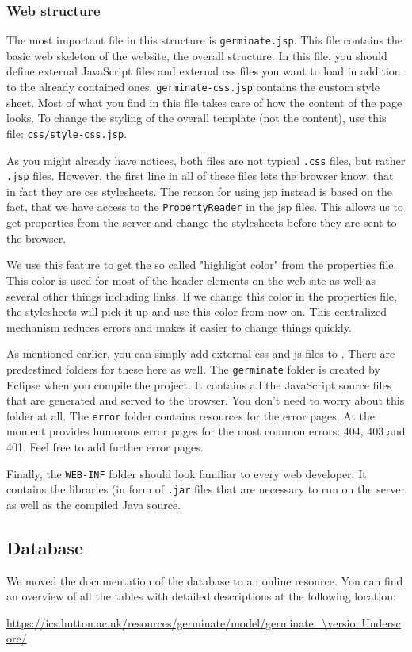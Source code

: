 \subsubsection{Web structure}
The most important file in this structure is \texttt{germinate.jsp}. This file contains the basic web skeleton of the website, \ie the overall structure. In this file, you should define external JavaScript files and external css files you want to load in addition to the already contained ones. \texttt{germinate-css.jsp} contains the custom {\germinate} style sheet. Most of what you find in this file takes care of how the content of the page looks. To change the styling of the overall template (not the content), use this file: \texttt{css/style-css.jsp}.

As you might already have notices, both files are not typical \texttt{.css} files, but rather \texttt{.jsp} files. However, the first line in all of these files lets the browser know, that in fact they are css stylesheets. The reason for using jsp instead is based on the fact, that we have access to the \texttt{PropertyReader} in the jsp files. This allows us to get properties from the server and change the stylesheets before they are sent to the browser.

We use this feature to get the so called "highlight color" from the properties file. This color is used for most of the header elements on the web site as well as several other things including links. If we change this color in the properties file, the stylesheets will pick it up and use this color from now on. This centralized mechanism reduces errors and makes it easier to change things quickly.

As mentioned earlier, you can simply add external css and js files to {\germinate}. There are predestined folders for these here as well. The \texttt{germinate} folder is created by Eclipse when you compile the project. It contains all the JavaScript source files that are generated and served to the browser. You don't need to worry about this folder at all. The \texttt{error} folder contains resources for the error pages. At the moment {\germinate} provides humorous error pages for the most common errors: 404, 403 and 401. Feel free to add further error pages.

Finally, the \texttt{WEB-INF} folder should look familiar to every web developer. It contains the libraries (in form of \texttt{.jar} files that are necessary to run {\germinate} on the server as well as the compiled Java source. 

\subsection{Database}
\label{sec:structure-database}

We moved the documentation of the database to an online resource. You can find an overview of all the tables with detailed descriptions at the following location:
\begin{center}
	\url{https://ics.hutton.ac.uk/resources/germinate/model/germinate_\versionUnderscore/}
\end{center}